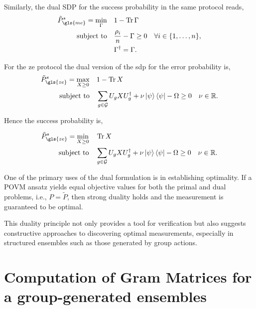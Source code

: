 \documentclass[12pt,letterpaper]{article}
\DeclareMathOperator{\tr}{Tr}
\begin{document}
Similarly, the dual SDP for the success probability in the same protocol reads,
\begin{align*}
	\tilde{P}_{\gls{me}}^s = \min_{\Gamma} \quad & 1 - \tr{\Gamma} \\
	\text{subject to} \quad & \frac{\rho_i}{n} - \Gamma \geq 0 \quad \forall i \in \{1, \dots, n\}, \\
	& \Gamma^\dagger = \Gamma.
\end{align*}

For the \gls{ze} protocol the dual version of the \gls{sdp} for the error probability is,
\begin{align*}
	\tilde{P}_{\gls{ze}}^s = \max_{X\geq 0} \quad & 1-\tr{X} \\
	\text{subject to} \quad & \sum_{g\in\mathcal{G}}U_gXU_g^\dagger+ \nu\ket{\psi}\bra{\psi}-\Omega \geq 0 \quad \nu \in \mathbb{R}.
\end{align*}

Hence the success probability is,

\begin{align*}
	\tilde{P}_{\gls{ze}}^s = \min_{X\geq 0} \quad & \tr{X} \\
	\text{subject to} \quad & \sum_{g\in\mathcal{G}}U_gXU_g^\dagger+ \nu\ket{\psi}\bra{\psi}-\Omega \geq 0 \quad \nu \in \mathbb{R}.
\end{align*}

One of the primary uses of the dual formulation is in establishing optimality. If a POVM ansatz yields equal objective values for both the primal and dual problems, i.e., $P = \tilde{P}$, then strong duality holds and the measurement is guaranteed to be optimal.

This duality principle not only provides a tool for verification but also suggests constructive approaches to discovering optimal measurements, especially in structured ensembles such as those generated by group actions.

\section{Computation of Gram Matrices for a group-generated ensembles}\label{appendixComputationGroupGeneratedGramMatrices}
\end{document}
